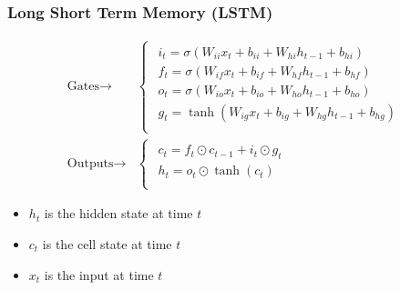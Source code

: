 \documentclass[usenames,dvipsnames]{beamer}
\begin{document}
\begin{frame}
\frametitle{Long Short Term Memory (LSTM)}
\begin{equation*}
  \begin{split}
  \text{Gates} \rightarrow & \begin{cases}
  \begin{array}{ll}
              i_t = \sigma(W_{ii} x_t + b_{ii} + W_{hi} h_{t-1} + b_{hi}) \\
              f_t = \sigma(W_{if} x_t + b_{if} + W_{hf} h_{t-1} + b_{hf}) \\
              o_t = \sigma(W_{io} x_t + b_{io} + W_{ho} h_{t-1} + b_{ho}) \\
              g_t = \tanh(W_{ig} x_t + b_{ig} + W_{hg} h_{t-1} + b_{hg}) \\
  \end{array}
  \end{cases} \\
  \text{Outputs} \rightarrow & \begin{cases}
  \begin{array}{ll}
              c_t = f_t \odot c_{t-1} + i_t \odot g_t \\
              h_t = o_t \odot \tanh(c_t) \\
  \end{array}
\end{cases}
\end{split}
\end{equation*}

\begin{itemize}
  \item $h_t$ is the hidden state at time $t$
  \item $c_t$ is the cell state at time $t$
  \item $x_t$ is the input at time $t$

\end{itemize}
\end{frame}
\end{document}
